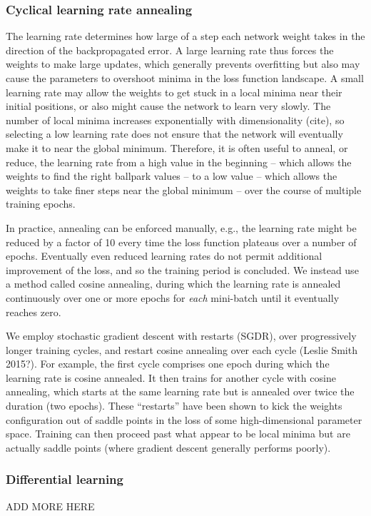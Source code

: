 \documentclass[fleqn,usenatbib]{mnras}
\begin{document}
\subsubsection{Cyclical learning rate annealing}
The learning rate determines how large of a step each network weight takes in the direction of the backpropagated error.
A large learning rate thus forces the weights to make large updates, which generally prevents overfitting but also may cause the parameters to overshoot minima in the loss function landscape.
A small learning rate may allow the weights to get stuck in a local minima near their initial positions, or also might cause the network to learn very slowly.
The number of local minima increases exponentially with dimensionality (cite), so selecting a low learning rate does not ensure that the network will eventually make it to near the global minimum.
Therefore, it is often useful to anneal, or reduce, the learning rate from a high value in the beginning -- which allows the weights to find the right ballpark values -- to a low value -- which allows the weights to take finer steps near the global minimum -- over the course of multiple training epochs.

In practice, annealing can be enforced manually, e.g., the learning rate might be reduced by a factor of 10 every time the loss function plateaus over a number of epochs.
Eventually even reduced learning rates do not permit additional improvement of the loss, and so the training period is concluded.
We instead use a method called cosine annealing, during which the learning rate is annealed continuously over one or more epochs for \textit{each} mini-batch until it eventually reaches zero.


We employ stochastic gradient descent with restarts (SGDR), over progressively longer training cycles, and restart cosine annealing over each cycle (Leslie Smith 2015?). 
For example, the first cycle comprises one epoch during which the learning rate is cosine annealed.
It then trains for another cycle with cosine annealing, which starts at the same learning rate but is annealed over twice the duration (two epochs).
These ``restarts'' have been shown to kick the weights configuration out of saddle points in the loss of some high-dimensional parameter space.
Training can then proceed past what appear to be local minima but are actually saddle points (where gradient descent generally performs poorly).


\subsubsection{Differential learning}
ADD MORE HERE
\end{document}
